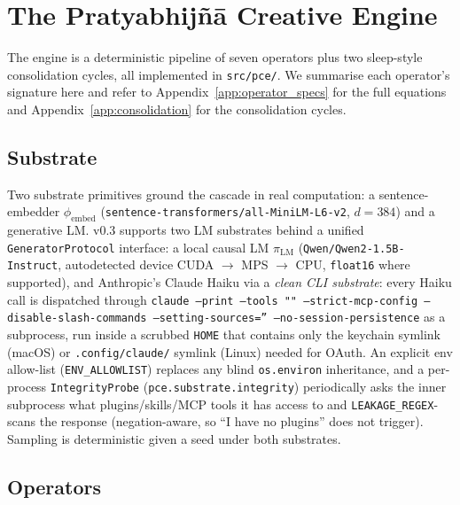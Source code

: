 \section{The Pratyabhij\~n\=a Creative Engine}\label{sec:engine}

The engine is a deterministic pipeline of seven operators plus two sleep-style consolidation cycles, all implemented in \texttt{src/pce/}. We summarise each operator's signature here and refer to Appendix~\ref{app:operator_specs} for the full equations and Appendix~\ref{app:consolidation} for the consolidation cycles.

\subsection{Substrate}
Two substrate primitives ground the cascade in real computation: a sentence-embedder $\phi_{\text{embed}}$ (\texttt{sentence-transformers/all-MiniLM-L6-v2}, $d=384$) and a generative LM. v0.3 supports two LM substrates behind a unified \texttt{GeneratorProtocol} interface: a local causal LM $\pi_{\text{LM}}$ (\texttt{Qwen/Qwen2-1.5B-Instruct}, autodetected device CUDA $\rightarrow$ MPS $\rightarrow$ CPU, \texttt{float16} where supported), and Anthropic's Claude Haiku via a \emph{clean CLI substrate}: every Haiku call is dispatched through \texttt{claude --print --tools "" --strict-mcp-config --disable-slash-commands --setting-sources='' --no-session-persistence} as a subprocess, run inside a scrubbed \texttt{HOME} that contains only the keychain symlink (macOS) or \texttt{.config/claude/} symlink (Linux) needed for OAuth. An explicit env allow-list (\texttt{ENV\_ALLOWLIST}) replaces any blind \texttt{os.environ} inheritance, and a per-process \texttt{IntegrityProbe} (\texttt{pce.substrate.integrity}) periodically asks the inner subprocess what plugins/skills/MCP tools it has access to and \texttt{LEAKAGE\_REGEX}-scans the response (negation-aware, so ``I have no plugins'' does not trigger). Sampling is deterministic given a seed under both substrates.

\subsection{Operators}


